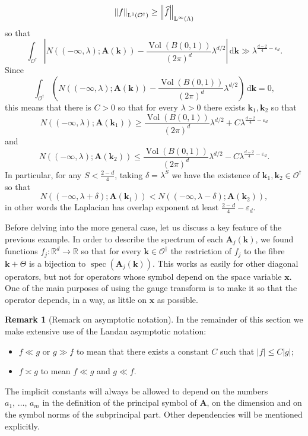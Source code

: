\documentclass[10pt]{amsart}
\theoremstyle{definition}\newtheorem{defi}[theo]{Definition}\newtheorem{rema}[theo]{Remark}\newtheorem{exam}[theo]{Example}\newtheorem{nota}[theo]{Notation}
\DeclareMathOperator{\spec}{spec}
\newcommand{\de}{\, \mathrm{d}}
\newcommand{\RL}{\mathrm{L}}
\newcommand{\R}{\mathbb R}
\newcommand{\CO}{\mathcal{O}}
\newcommand{\BA}{\mathbf A}
\newcommand{\bx}{\mathbf x}
\newcommand{\bk}{\mathbf k}
\newcommand{\eps}{\varepsilon}
\newcommand{\abs}[1]{\left\lvert #1 \right\rvert}
\newcommand{\norm}[1]{\left\| #1 \right\|}
\let\oldhat\hat
\renewcommand*{\hat}[1]{\mathchoice{\widehat{#1}}{\widehat{#1}}{\oldhat{#1}}{\oldhat{#1}}}
\begin{document}
\begin{exem}
\begin{equation}
\norm{f}_{\RL^1(\CO^\dagger)} \ge \norm{\hat f}_{\RL^\infty(\Lambda)}
\end{equation}
so that
\begin{equation}
\int_{\CO^\dagger} \abs{N((- \infty, \lambda);\BA(\bk)) -
\frac{\operatorname{Vol}(B(0,1))}{(2\pi)^d} \lambda^{d/2}} \de \bk \gg
\lambda^{\frac{d-2}{4} - \eps_d}.
\end{equation}
Since
\begin{equation}
\int_{\CO^\dagger}\left(N((-\infty,\lambda);\BA(\bk)) -
\frac{\operatorname{Vol}(B(0,1))}{(2\pi)^d} \lambda^{d/2}\right) \de \bk = 0,
\end{equation}
this means that there is $C > 0$ so that for every $\lambda > 0$ there exists $\bk_1,\bk_2$ so that
\begin{equation}
N((-\infty,\lambda);\BA(\bk_1)) \ge
\frac{\operatorname{Vol}(B(0,1))}{(2\pi)^d} \lambda^{d/2} + C
\lambda^{\frac{d-2}{4} - \eps_d}
\end{equation}
and
\begin{equation}
N((-\infty,\lambda);\BA(\bk_2)) \le
\frac{\operatorname{Vol}(B(0,1))}{(2\pi)^d} \lambda^{d/2} - C
\lambda^{\frac{d-2}{4} - \eps_d}.
\end{equation}
In particular, for any $S < \frac{2-d}{4}$, taking $\delta = \lambda^{S}$ we have the existence of $\bk_1, \bk_2 \in \CO^\dagger$ so that
\begin{equation}
N((-\infty, \lambda + \delta);\BA(\bk_1)) < N((-\infty, \lambda -
\delta);\BA(\bk_2)),
\end{equation}
in other words the Laplacian has overlap exponent at least $\frac{2-d}{4} -
\eps_d$.
\end{exem}

Before delving into the more general case, let us discuss a key feature of the previous example. In order to describe the spectrum of each $\BA_j(\bk)$, we found functions $f_j : \R^d \to \R$ so that for every $\bk \in \CO^\dagger$ the restriction of $f_j$ to the fibre $\bk + \Theta$ is a bijection to $\spec(\BA_j(\bk))$. This works as easily for other diagonal operators, but not for operators whose symbol depend on the space variable $\bx$. One of the main purposes of using the gauge transform is to make it so that the operator depends, in a way, as little on $\bx$ as possible.

\begin{rema}[Remark on asymptotic notation]
In the remainder of this section we make extensive use of the Landau asymptotic notation:
\begin{itemize}
\item $f \ll g$ or $g \gg f$ to mean that there exists a constant $C$ such that $\abs f \le C \abs g$;
\item $f \asymp g$ to mean $f \ll g$ and $g \ll f$.
\end{itemize}
The implicit constants will always be allowed to depend on the numbers $a_1,\,\dotsc,\,a_m$ in the definition of the principal symbol of $\BA$, on the dimension and on the symbol norms of the subprincipal part. Other dependencies will be mentioned explicitly.
\end{rema}
\end{document}
